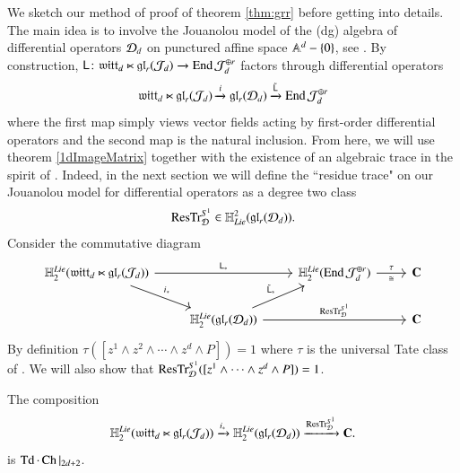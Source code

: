 \documentclass[main.tex]{subfiles}
\begin{document}
We sketch our method of proof of theorem \ref{thm:grr} before getting into details.
The main idea is to involve the Jouanolou model of the (dg) algebra of differential operators $\cD_d$ on punctured affine space $\AA^d - \{0\}
$, see \cite[section 1.5]{GWvir2d}.
By construction, $\sfL \colon \lie{witt}_d \ltimes \lie{gl}_r(\cJ_d) \to \op{End} \cJ_d^{\oplus r}$ factors through differential operators
\begin{equation}\label{}
  \lie{witt}_d \ltimes \lie{gl}_r(\cJ_d)\xto{i} \lie{gl}_r(\cD_d) \xto{\til \sfL} \op{End} \cJ_d ^{\oplus r}
\end{equation}
where the first map simply views vector fields acting by first-order differential operators and the second map is the natural inclusion.
From here, we will use theorem \ref{1dImageMatrix} together with the existence of an algebraic trace in the spirit of
\cite{FFS}.
Indeed, in the next section we will define the ``residue trace" on our Jouanolou model for differential operators as a degree two class 
\begin{equation}\label{eq:trD}
  \op{ResTr}_{\cD}^{S^1} \in \HH^2_{Lie}(\lie{gl}_r(\cD_{d})) . 
\end{equation}
Consider the commutative diagram 
\begin{equation}\label{eq:diagram}
  \begin{tikzcd}
    \HH_2^{Lie}(\lie{witt}_d\ltimes \lie{gl}_r(\cJ_d)) \ar[rr,"\sfL_*"] \ar[dr,"i_*"] & & \HH_2^{Lie}(\op{End} \cJ_d^{\oplus r}) \ar[r,"\tau","\cong"'] & \C \\
                                                                     & \HH_2^{Lie}(\lie{gl}_r(\cD_d)) \ar[rr,"\op{ResTr}^{S^1}_{\cD}",
    ""'] \ar[ur,"\til \sfL_*"] & &
                                                                 \C 
                                                                 \end{tikzcd}
                                                               \end{equation}
By definition $\tau([z^1 \wedge z^2 \wedge \cdots \wedge z^d \wedge P]) = 1$
where $\tau$ is the universal Tate class of \cite{FHK}.
We will also show that $\op{ResTr}_{\cD}^{S^1}([z^1 \wedge \cdots \wedge z^d \wedge P]) = 1$.

\begin{theorem}\label{thm:grrD}
The composition 
\begin{equation}\label{}
  \HH_2^{Lie}(\lie{witt}_d\ltimes \lie{gl}_r(\cJ_d)) \xto{i_*} \HH_2^{Lie}(\lie{gl}_r(\cD_d)) \xto{\op{ResTr}_{\cD}^{S^1}} \C .
\end{equation}
is $\op{Td}\cdot \op{Ch}|_{2d+2}$.
\end{theorem}
\end{document}
